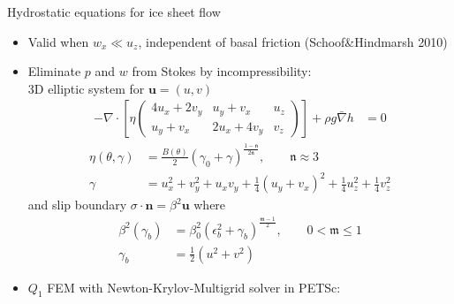 \begin{frame}[shrink=5]{Hydrostatic equations for ice sheet flow}
  \begin{itemize}
  \item Valid when $w_x \ll u_z$, independent of basal friction {\small (Schoof\&Hindmarsh 2010)}
  \item Eliminate $p$ and $w$ from Stokes by incompressibility:\\
    \quad 3D elliptic system for $\bm u = (u,v)$
    \begin{align*}
      - \nabla\cdot \left[ \eta
        \begin{pmatrix}
          4 u_x + 2 v_y & u_y + v_x & u_z \\
          u_y + v_x & 2 u_x + 4 v_y & v_z
        \end{pmatrix} \right] + \rho g \bar\nabla h & = 0
    \end{align*}
    \begin{align*}
      \eta(\theta,\gamma) &= \frac{B(\theta)}{2} (\gamma_0 + \gamma)^{\frac{1-\mathfrak n}{2\mathfrak n}}, \qquad \mathfrak n \approx 3 \\
      \gamma &= u_x^2 + v_y^2 + u_xv_y + \frac 1 4 (u_y+v_x)^2 + \frac 1 4 u_z^2 + \frac 1 4 v_z^2
    \end{align*}
    and slip boundary $\sigma \cdot \bm n = \beta^2 \bm u$ where
    \begin{align*}
      \beta^2(\gamma_b) &= \beta_0^2 (\epsilon_b^2 + \gamma_b)^{\frac{\mathfrak m-1}{2}}, \qquad 0 < \mathfrak m \le 1 \\
      \gamma_b &= \frac 1 2 (u^2 + v^2)
    \end{align*}
  \item $Q_1$ FEM with Newton-Krylov-Multigrid solver in PETSc: 
  \end{itemize}
\end{frame}
